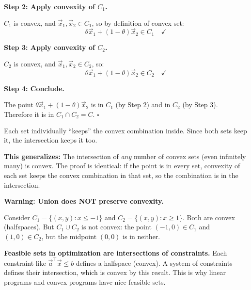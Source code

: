 \documentclass[10pt]{article}
\theoremstyle{definition}
\theoremstyle{plain}
\begin{document}
\textbf{Step 2: Apply convexity of $C_1$.}

$C_1$ is convex, and $\vec{x}_1, \vec{x}_2 \in C_1$, so by definition of convex set:
\[
    \theta \vec{x}_1 + (1-\theta)\vec{x}_2 \in C_1 \quad \checkmark
\]

\textbf{Step 3: Apply convexity of $C_2$.}

$C_2$ is convex, and $\vec{x}_1, \vec{x}_2 \in C_2$, so:
\[
    \theta \vec{x}_1 + (1-\theta)\vec{x}_2 \in C_2 \quad \checkmark
\]

\textbf{Step 4: Conclude.}

The point $\theta \vec{x}_1 + (1-\theta)\vec{x}_2$ is in $C_1$ (by Step 2) and in $C_2$ (by Step 3). Therefore it is in $C_1 \cap C_2 = C$. $\square$

\begin{tcolorbox}[colframe=black!50, title={\small The logic in one sentence}]
Each set individually ``keeps'' the convex combination inside. Since both sets keep it, the intersection keeps it too.
\end{tcolorbox}

\begin{result}
\textbf{This generalizes:} The intersection of \emph{any} number of convex sets (even infinitely many) is convex. The proof is identical: if the point is in every set, convexity of each set keeps the convex combination in that set, so the combination is in the intersection.
\end{result}

\begin{tcolorbox}[colframe=black!50]
\textbf{Warning: Union does NOT preserve convexity.}

Consider $C_1 = \{(x,y) : x \le -1\}$ and $C_2 = \{(x,y) : x \ge 1\}$. Both are convex (halfspaces). But $C_1 \cup C_2$ is not convex: the point $(-1, 0) \in C_1$ and $(1, 0) \in C_2$, but the midpoint $(0, 0)$ is in neither.
\end{tcolorbox}

\begin{tcolorbox}[colframe=black!50, title={\small Why this result matters in practice}]
\textbf{Feasible sets in optimization are intersections of constraints.} Each constraint like $\vec{a}^\top \vec{x} \le b$ defines a halfspace (convex). A system of constraints defines their intersection, which is convex by this result. This is why linear programs and convex programs have nice feasible sets.
\end{tcolorbox}

\end{document}
